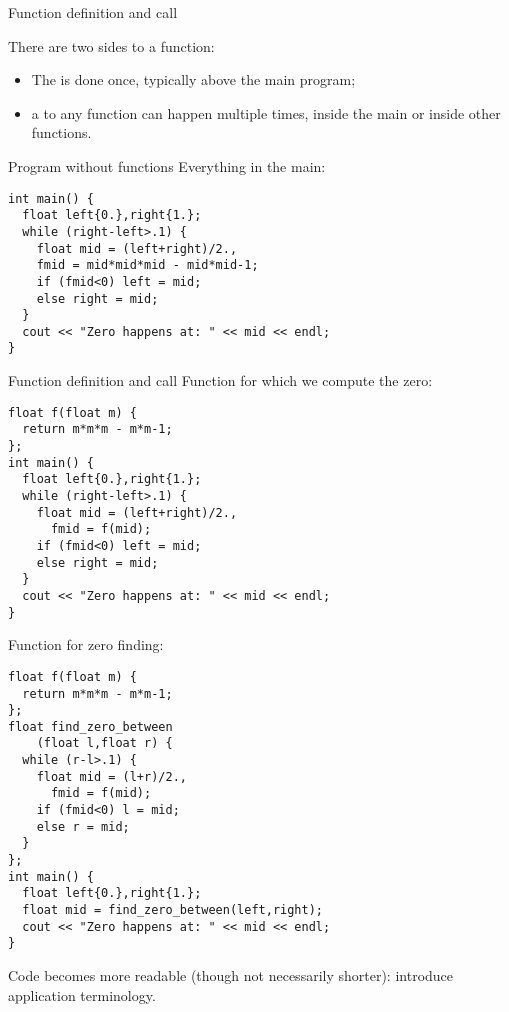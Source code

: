  {Function definition and call}

There are two sides to a function:
\begin{itemize}
\item
  The  is done once, typically
  above the main program;
\item a  to any function can happen
  multiple times, inside the main or inside other functions.
\end{itemize}

\begin{block}{Program without functions}
  \label{sl:nodef-nocall}
  Everything in the main:
  \begin{multicols}{2}
\begin{lstlisting}
int main() {
  float left{0.},right{1.};
  while (right-left>.1) {
    float mid = (left+right)/2.,
    fmid = mid*mid*mid - mid*mid-1;
    if (fmid<0) left = mid;
    else right = mid;  
  }
  cout << "Zero happens at: " << mid << endl;
}
\end{lstlisting}
  \end{multicols}
\end{block}

\begin{block}{Function definition and call}
  \label{sl:def-call}
Function for which we compute the zero:
  \begin{multicols}{2}
\begin{lstlisting}
float f(float m) {
  return m*m*m - m*m-1;
};
int main() {
  float left{0.},right{1.};
  while (right-left>.1) {
    float mid = (left+right)/2.,
      fmid = f(mid);
    if (fmid<0) left = mid;
    else right = mid;  
  }
  cout << "Zero happens at: " << mid << endl;
}
\end{lstlisting}
  \end{multicols}
Function for zero finding:
  \begin{multicols}{2}
\begin{lstlisting}
float f(float m) {
  return m*m*m - m*m-1;
};
float find_zero_between
    (float l,float r) {
  while (r-l>.1) {
    float mid = (l+r)/2.,
      fmid = f(mid);
    if (fmid<0) l = mid;
    else r = mid;  
  }
};
int main() {
  float left{0.},right{1.};
  float mid = find_zero_between(left,right);
  cout << "Zero happens at: " << mid << endl;
}
\end{lstlisting}
  \end{multicols}
Code becomes more readable (though not necessarily shorter): introduce
application terminology.
\end{block}

